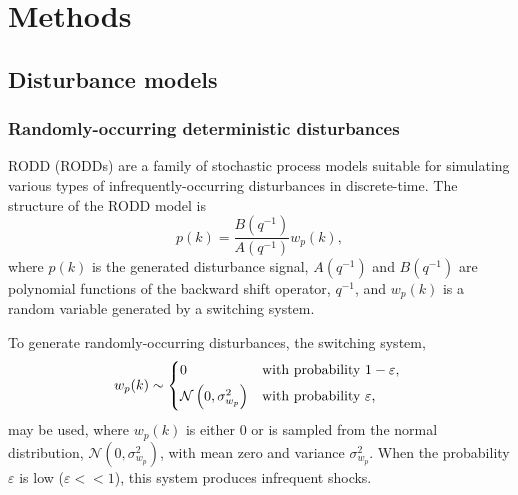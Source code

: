 \chapter{Methods}
\label{chap-methods}

\section{Disturbance models}

\subsection{Randomly-occurring deterministic disturbances} \label{sec:RODD}

\Acrlong{RODD} (\acrshort{RODD}s) \citep{macgregor_duality_1984} are a family of stochastic process models suitable for simulating various types of infrequently-occurring disturbances in discrete-time.  The structure of the \gls{RODD} model is
\begin{equation} \label{eq:RODD}
	p(k) = \frac{B(q^{-1})}{A(q^{-1})} w_p(k),
\end{equation}
where $p(k)$ is the generated disturbance signal, $A(q^{-1})$ and $B(q^{-1})$ are polynomial functions of the backward shift operator, $q^{-1}$, and $w_p(k)$ is a random variable generated by a switching system.
%
%
%
%
%

To generate randomly-occurring disturbances, the switching system,
\begin{equation} \label{eq:wpk1} 
	w_p(k) \sim 
	\begin{cases*}
		0 & with probability $1-\varepsilon$, \\
		\mathcal{N}\left( 0, \sigma_{w_p}^2 \right) & with probability $\varepsilon$,
	\end{cases*}
\end{equation}
%
may be used, where $w_p(k)$ is either 0 or is sampled from the normal distribution, $\mathcal{N}(0,\sigma_{w_p}^2)$, with mean zero and variance $\sigma_{w_p}^2$.  When the probability $\varepsilon$ is low ($\varepsilon<<1$), this system produces infrequent shocks.
%

